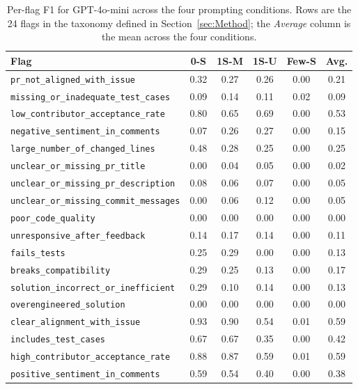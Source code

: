 \begin{table}[!htbp]
\centering
\caption{Per-flag F1 for GPT-4o-mini across the four prompting
conditions. Rows are the 24 flags in the taxonomy defined in
Section~\ref{sec:Method}; the \emph{Average} column is the mean across
the four conditions.}
\label{tab:perflag-gpt-4o-mini}
\small
\begin{tabular}{lccccc}
\toprule
Flag & 0-S & 1S-M & 1S-U & Few-S & Avg. \\
\midrule
\texttt{pr\_not\_aligned\_with\_issue} & 0.32 & 0.27 & 0.26 & 0.00 & 0.21 \\
\texttt{missing\_or\_inadequate\_test\_cases} & 0.09 & 0.14 & 0.11 & 0.02 & 0.09 \\
\texttt{low\_contributor\_acceptance\_rate} & 0.80 & 0.65 & 0.69 & 0.00 & 0.53 \\
\texttt{negative\_sentiment\_in\_comments} & 0.07 & 0.26 & 0.27 & 0.00 & 0.15 \\
\texttt{large\_number\_of\_changed\_lines} & 0.48 & 0.28 & 0.25 & 0.00 & 0.25 \\
\texttt{unclear\_or\_missing\_pr\_title} & 0.00 & 0.04 & 0.05 & 0.00 & 0.02 \\
\texttt{unclear\_or\_missing\_pr\_description} & 0.08 & 0.06 & 0.07 & 0.00 & 0.05 \\
\texttt{unclear\_or\_missing\_commit\_messages} & 0.00 & 0.06 & 0.12 & 0.00 & 0.05 \\
\texttt{poor\_code\_quality} & 0.00 & 0.00 & 0.00 & 0.00 & 0.00 \\
\texttt{unresponsive\_after\_feedback} & 0.14 & 0.17 & 0.14 & 0.00 & 0.11 \\
\texttt{fails\_tests} & 0.25 & 0.29 & 0.00 & 0.00 & 0.13 \\
\texttt{breaks\_compatibility} & 0.29 & 0.25 & 0.13 & 0.00 & 0.17 \\
\texttt{solution\_incorrect\_or\_inefficient} & 0.29 & 0.10 & 0.14 & 0.00 & 0.13 \\
\texttt{overengineered\_solution} & 0.00 & 0.00 & 0.00 & 0.00 & 0.00 \\
\texttt{clear\_alignment\_with\_issue} & 0.93 & 0.90 & 0.54 & 0.01 & 0.59 \\
\texttt{includes\_test\_cases} & 0.67 & 0.67 & 0.35 & 0.00 & 0.42 \\
\texttt{high\_contributor\_acceptance\_rate} & 0.88 & 0.87 & 0.59 & 0.01 & 0.59 \\
\texttt{positive\_sentiment\_in\_comments} & 0.59 & 0.54 & 0.40 & 0.00 & 0.38 \\

\end{tabular}
\end{table}
